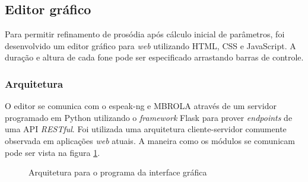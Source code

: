 
\subsection{Editor gráfico}
Para permitir refinamento de prosódia após cálculo inicial de parâmetros, foi
desenvolvido um editor gráfico para \emph{web} utilizando HTML, CSS e
JavaScript. A duração e altura de cada fone pode ser especificado arrastando
barras de controle.

\subsubsection{Arquitetura}
 O editor se comunica com o espeak-ng e MBROLA através de um
servidor programado em Python utilizando o \emph{framework} Flask para prover
\emph{endpoints} de uma API \emph{RESTful}. Foi utilizada uma arquitetura cliente-servidor \cite{rest} comumente observada em aplicações \emph{web} atuais. A maneira como os módulos se comunicam pode ser vista na figura \ref{fig:arch}.

\begin{figure}[!htbp]
\centering
{}
\caption{Arquitetura para o programa da interface gráfica}
\label{fig:arch}
\end{figure}

